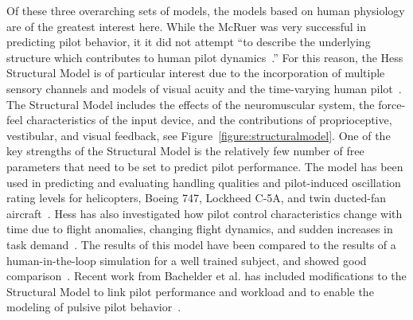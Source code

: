 \documentclass[float=false, crop=false]{standalone}
\begin{document}
Of these three overarching sets of models, the models based on human physiology are of the greatest interest here.
While the McRuer was very successful in predicting pilot behavior, it it did not attempt ``to describe the underlying structure which contributes to human pilot dynamics~\cite{Hess1980}.''
For this reason, the Hess Structural Model is of particular interest due to the incorporation of multiple sensory channels and models of visual acuity and the time-varying human pilot~\cite{Hess2009}.
The Structural Model includes the effects of the neuromuscular system, the force-feel characteristics of the input device, and the contributions of proprioceptive, vestibular, and visual feedback, see Figure~\ref{figure:structuralmodel}.
One of the key strengths of the Structural Model is the relatively few number of free parameters that need to be set to predict pilot performance.
The model has been used in predicting and evaluating handling qualities and pilot-induced oscillation rating levels for helicopters, Boeing 747, Lockheed C-5A, and twin ducted-fan aircraft~\cite{Hess2013, Andreea-Irina2014, Grant2015}.
Hess has also investigated how pilot control characteristics change with time due to flight anomalies, changing flight dynamics, and sudden increases in task demand~\cite{Hess2009, Hess2016}.
The results of this model have been compared to the results of a human-in-the-loop simulation for a well trained subject, and showed good comparison~\cite{Hess2016}.
Recent work from Bachelder et al. has included modifications to the Structural Model to link pilot performance and workload and to enable the modeling of pulsive pilot behavior~\cite{Bachelder2017, Bachelder2018}.
\end{document}

